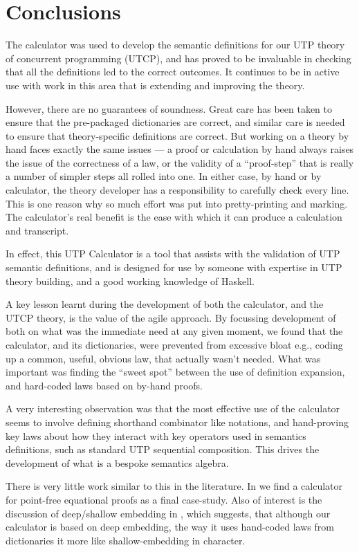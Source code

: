 \section{Conclusions}\label{sec:Conc}

The calculator was used to develop the semantic definitions
for our UTP theory of concurrent programming (UTCP),
and has proved to be invaluable in checking that all
the definitions led to the correct outcomes.
It continues to be in active use with work in this area
that is extending and improving the theory.

However, there are no guarantees of soundness.
Great care has been taken to ensure that the pre-packaged
dictionaries are correct,
and similar care is needed to ensure that theory-specific
definitions are correct.
But working on a theory by hand faces exactly the same issues
--- a proof or calculation by hand always raises the issue
of the correctness of a law, or the validity of a ``proof-step''
that is really a number of simpler steps all rolled into one.
In either case, by hand or by calculator,
the theory developer has a responsibility to carefully check every line.
This is one reason why so much effort was put into pretty-printing
and marking.
The calculator's real benefit is the ease with which
it can produce a calculation and transcript.

In effect, this UTP Calculator is a tool that assists
with the validation of UTP semantic definitions,
and is designed for use by someone with expertise
in UTP theory building,
and a good working knowledge of Haskell.

A key lesson learnt during the development
of both the calculator, and the UTCP theory,
is the value of the agile approach.
By focussing development of both on what
was the immediate need at any given moment,
we found that the calculator, and its dictionaries,
were prevented from excessive bloat
e.g., coding up a common, useful, obvious law,
that actually wasn't needed.
What was important was
finding the ``sweet spot'' between the use of definition
expansion, and hard-coded laws based on by-hand proofs.

A very interesting observation was that the most effective use
of the calculator seems to involve defining shorthand
combinator like notations, and hand-proving key laws
about how they interact with key operators used
in semantics definitions, such as standard UTP sequential composition.
This drives the development of what is a bespoke semantics algebra.


There is very little work similar to this in the literature.
In \cite{Bird14} we find a calculator
for point-free equational proofs as a final case-study.
Also of interest is the discussion of deep/shallow embedding
in \cite{Gibbons:2014:FDS},
which suggests, that although our calculator is based on deep embedding,
the way it uses hand-coded laws from dictionaries
it more like shallow-embedding in character.


